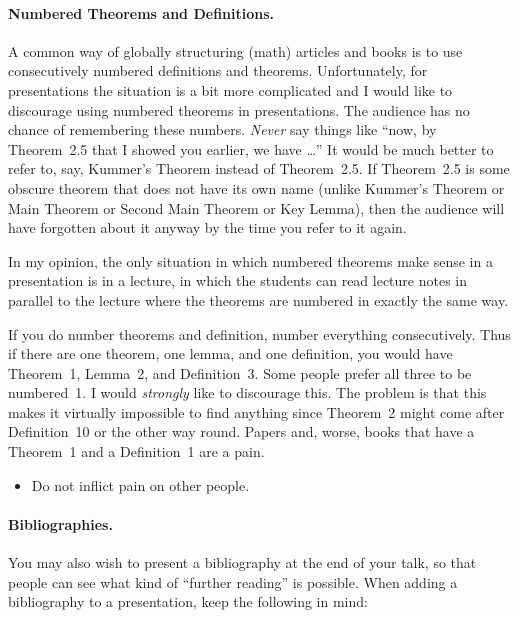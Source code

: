 \paragraph{Numbered Theorems and Definitions.}

A common way of globally structuring (math) articles and books is to
use consecutively numbered definitions and theorems. Unfortunately,
for presentations the situation is a bit more complicated and I would
like to discourage using numbered theorems in presentations. The
audience has no chance of remembering these numbers. \emph{Never} say
things like ``now, by Theorem~2.5 that I showed you earlier, we have
\dots'' It would be much better to refer to, say, Kummer's Theorem
instead of Theorem~2.5. If Theorem~2.5 is some obscure theorem that
does not have its own name (unlike Kummer's Theorem or Main Theorem or
Second Main Theorem or Key Lemma), then the audience will have
forgotten about it anyway by the time you refer to it again.

In my opinion, the only situation in which numbered theorems make
sense in a presentation is in a lecture, in which the students can read
lecture notes in parallel to the lecture where the theorems are
numbered in exactly the same way.

If you do number theorems and definition, number everything
consecutively. Thus if there are one theorem, one lemma, 
and one definition, you would have Theorem~1, Lemma~2, and
Definition~3. Some people prefer all three to be numbered~1. I would
\emph{strongly} like to discourage this. The problem is that this
makes it virtually impossible to find anything since Theorem~2 might
come after Definition~10 or the other way round. Papers and, worse,
books that have a Theorem~1 and a Definition~1 are a pain.
\begin{itemize}
\item
  Do not inflict pain on other people.
\end{itemize}


\paragraph{Bibliographies.}

You may also wish to present a bibliography at the end of your talk,
so that people can see what kind of ``further reading'' is possible. 
When adding a bibliography to a presentation, keep the following in mind:

